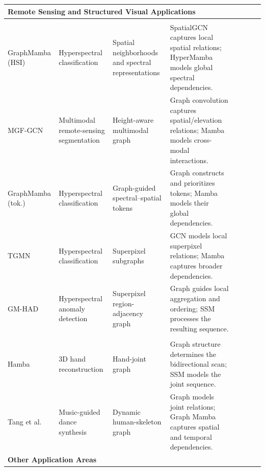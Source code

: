 \documentclass[acmsmall]{acmart}
\newcommand{\cmark}{\ding{51}}
\begin{document}
\begin{landscape}
\begin{longtable}{@{}
p{2.2cm}
p{2.8cm}
p{3.8cm}
p{7cm}
cccc
@{}}
\midrule
\multicolumn{8}{l}{\textbf{Remote Sensing and Structured Visual Applications}}\\
\midrule

\rowcolor{gray!12}
\multicolumn{8}{l}{\textbf{\textit{Remote sensing}}} \\

GraphMamba (HSI)~\cite{yang2024graphmamba} &
Hyperspectral classification &
Spatial neighborhoods and spectral representations &
SpatialGCN captures local spatial relations; HyperMamba models global spectral dependencies. &
\cmark & & & \\

MGF-GCN~\cite{zhao2025mgf} &
Multimodal remote-sensing segmentation &
Height-aware multimodal graph &
Graph convolution captures spatial/elevation relations; Mamba models cross-modal interactions. &
\cmark & & & \\

GraphMamba (tok.)~\cite{ahmad2025graphmamba} &
Hyperspectral classification &
Graph-guided spectral--spatial tokens &
Graph constructs and prioritizes tokens; Mamba models their global dependencies. &
& & \cmark & \\

TGMN~\cite{chu2025tgmn} &
Hyperspectral classification &
Superpixel subgraphs &
GCN models local superpixel relations; Mamba captures broader dependencies. &
& & & \cmark \\

GM-HAD~\cite{tang2026graph} &
Hyperspectral anomaly detection &
Superpixel region-adjacency graph &
Graph guides local aggregation and ordering; SSM processes the resulting sequence. &
& & \cmark & \\


\midrule
\rowcolor{gray!12}
\multicolumn{8}{l}{\textbf{\textit{Articulated and human motion}}} \\

Hamba~\cite{dong2024hamba} &
3D hand reconstruction &
Hand-joint graph &
Graph structure determines the bidirectional scan; SSM models the joint sequence. &
& & \cmark & \\

Tang et al.~\cite{tang2025spatial} &
Music-guided dance synthesis &
Dynamic human-skeleton graph &
Graph models joint relations; Graph Mamba captures spatial and temporal dependencies. &
& \cmark & \cmark & \\


\midrule
\multicolumn{8}{l}{\textbf{Other Application Areas}}\\
\midrule


\end{longtable}
\end{landscape}
\end{document}
